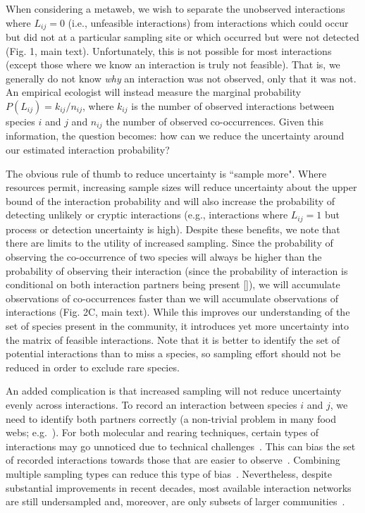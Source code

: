 \documentclass[12pt]{article}
\begin{document}
        When considering a metaweb, we wish to separate the unobserved interactions where $L_{ij} = 0$ (i.e., unfeasible interactions) from interactions which could occur but did not at a particular sampling site or which occurred but were not detected (Fig. 1, main text). Unfortunately, this is not possible for most interactions (except those where we know an interaction is truly not feasible). That is, we generally do not know \emph{why} an interaction was not observed, only that it was not. An empirical ecologist will instead measure the marginal probability $P(L_{ij}) = k_{ij}/n_{ij}$, where $k_{ij}$ is the number of observed interactions between species $i$ and $j$ and $n_{ij}$ the number of observed co-occurrences. Given this information, the question becomes: how can we reduce the uncertainty around our estimated interaction probability?


        The obvious rule of thumb to reduce uncertainty is ``sample more". Where resources permit, increasing sample sizes will reduce uncertainty about the upper bound of the interaction probability and will also increase the probability of detecting unlikely or cryptic interactions (e.g., interactions where $L_{ij} = 1$ but process or detection uncertainty is high). Despite these benefits, we note that there are limits to the utility of increased sampling. Since the probability of observing the co-occurrence of two species will always be higher than the probability of observing their interaction (since the probability of interaction is conditional on both interaction partners being present [\citealp{Gravel2018}]), we will accumulate observations of co-occurrences faster than we will accumulate observations of interactions (Fig. 2C, main text). While this improves our understanding of the set of species present in the community, it introduces yet more uncertainty into the matrix of feasible interactions. Note that it is better to identify the set of potential interactions than to miss a species, so sampling effort should not be reduced in order to exclude rare species.


        An added complication is that increased sampling will not reduce uncertainty evenly across interactions. To record an interaction between species $i$ and $j$, we need to identify both partners correctly (a non-trivial problem in many food webs; e.g.~\citealp{Kaartinen2011,Roslin2016}). For both molecular and rearing techniques, certain types of interactions may go unnoticed due to technical challenges~\citep{Wirta2014}. This can bias the set of recorded interactions towards those that are easier to observe~\citep{Carstensen2014,Jordano2016}. Combining multiple sampling types can reduce this type of bias~\citep{Wirta2014,Jordano2016}. Nevertheless, despite substantial improvements in recent decades, most available interaction networks are still undersampled and, moreover, are only subsets of larger communities~\citep{Bartomeus2013,Jordano2016}. 
\end{document}
